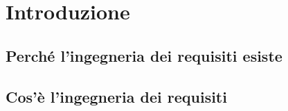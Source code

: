 \chapter{Introduzione}
\section{Perché l'ingegneria dei requisiti esiste}
\section{Cos'è l'ingegneria dei requisiti}